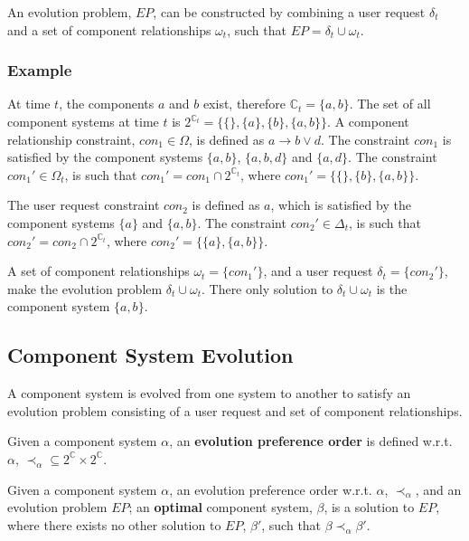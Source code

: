 An evolution problem, $EP$, can be constructed by combining a user request $\delta_t$ and a set of component relationships $\omega_t$, such that $EP = \delta_t \cup \omega_t$.

\subsubsection{Example}
At time $t$, the components $a$ and $b$ exist, therefore $\mathbb{C}_t = \{a,b\}$.
The set of all component systems at time $t$ is $2^{\mathbb{C}_t} = \{\{\},\{a\},\{b\},\{a,b\}\}$.
A component relationship constraint, $con_1 \in \Omega$, is defined as $a \rightarrow b \vee d$.
The constraint $con_1$ is satisfied by the component systems $\{a,b\}$, $\{a,b,d\}$ and $\{a,d\}$.
The constraint $con_1' \in \Omega_t$, is such that $con_1' = con_1 \cap 2^{\mathbb{C}_t}$, where $con_1' = \{\{\},\{b\},\{a,b\}\}$.

The user request constraint $con_2$ is defined as $a$, which is satisfied by the component systems $\{a\}$ and $\{a,b\}$.
The constraint $con_2' \in \Delta_t$, is such that $con_2' = con_2 \cap 2^{\mathbb{C}_t}$, where $con_2' = \{\{a\},\{a,b\}\}$.

A set of component relationships $\omega_t = \{con_1'\}$, and a user request $\delta_t = \{con_2'\}$, make the evolution problem $\delta_t \cup \omega_t$.
There only solution to $\delta_t \cup \omega_t$ is the component system $\{a,b\}$.  

\subsection{Component System Evolution}
\label{formal.evo}
A component system is evolved from one system to another to satisfy an evolution problem consisting of a user request and set of component relationships.

\begin{defs}
Given a component system $\alpha$, an \textbf{evolution preference order} is defined w.r.t. $\alpha$,  $\prec_{\alpha} \subseteq 2^{\mathbb{C}} \times 2^{\mathbb{C}}$.
\end{defs}

\begin{defs}
Given a component system $\alpha$, an evolution preference order w.r.t. $\alpha$, $\prec_{\alpha}$, and an evolution problem $EP$;
an \textbf{optimal} component system, $\beta$, is a solution to $EP$, where there exists no other solution to $EP$, $\beta'$, such that $\beta \prec_{\alpha} \beta'$.   
\end{defs}

